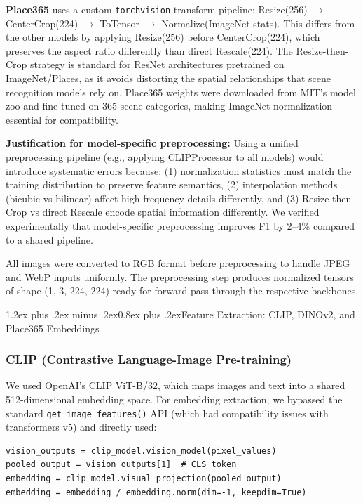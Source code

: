 \documentclass[conference]{IEEEtran}
\makeatletter
\renewcommand{\subsection}{\@startsection{subsection}{2}{\z@}%
  {1.2ex plus .2ex minus .2ex}{0.8ex plus .2ex}{\normalfont\bfseries}}
\makeatother
\begin{document}
\textbf{Place365} uses a custom \texttt{torchvision} transform pipeline: Resize(256) $\rightarrow$ CenterCrop(224) $\rightarrow$ ToTensor $\rightarrow$ Normalize(ImageNet stats). This differs from the other models by applying Resize(256) before CenterCrop(224), which preserves the aspect ratio differently than direct Rescale(224). The Resize-then-Crop strategy is standard for ResNet architectures pretrained on ImageNet/Places, as it avoids distorting the spatial relationships that scene recognition models rely on. Place365 weights were downloaded from MIT's model zoo and fine-tuned on 365 scene categories, making ImageNet normalization essential for compatibility.

\textbf{Justification for model-specific preprocessing:} Using a unified preprocessing pipeline (e.g., applying CLIPProcessor to all models) would introduce systematic errors because: (1) normalization statistics must match the training distribution to preserve feature semantics, (2) interpolation methods (bicubic vs bilinear) affect high-frequency details differently, and (3) Resize-then-Crop vs direct Rescale encode spatial information differently. We verified experimentally that model-specific preprocessing improves F1 by 2--4\% compared to a shared pipeline.

All images were converted to RGB format before preprocessing to handle JPEG and WebP inputs uniformly. The preprocessing step produces normalized tensors of shape (1, 3, 224, 224) ready for forward pass through the respective backbones.

\subsection{Feature Extraction: CLIP, DINOv2, and Place365 Embeddings}

\subsubsection{CLIP (Contrastive Language-Image Pre-training)}
We used OpenAI's CLIP ViT-B/32, which maps images and text into a shared 512-dimensional embedding space. For embedding extraction, we bypassed the standard \texttt{get\_image\_features()} API (which had compatibility issues with transformers v5) and directly used:

\begin{verbatim}
vision_outputs = clip_model.vision_model(pixel_values)
pooled_output = vision_outputs[1]  # CLS token
embedding = clip_model.visual_projection(pooled_output)
embedding = embedding / embedding.norm(dim=-1, keepdim=True)
\end{verbatim}
\end{document}

